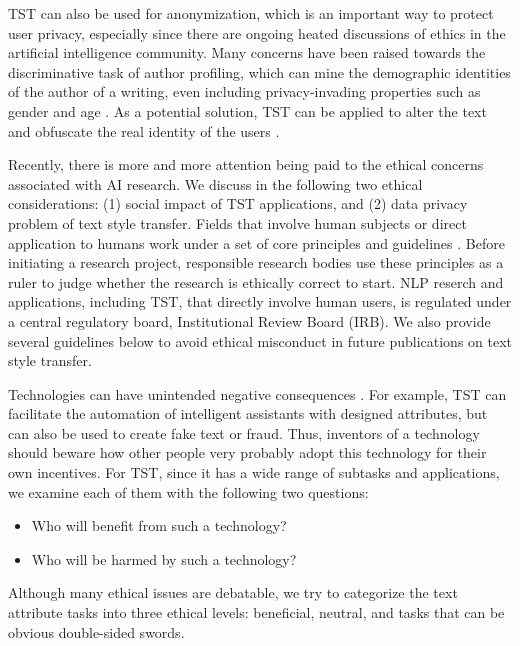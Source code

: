 TST can also be used for anonymization, which is an important way to protect user privacy, especially since there are ongoing heated discussions of ethics in the artificial intelligence community. Many concerns have been raised towards the discriminative task of author profiling, which can mine the demographic identities of the author of a writing, even including privacy-invading properties such as gender and age . As a potential solution, TST can be applied to alter the text and obfuscate the real identity of the users .

\label{sec:ethics}
Recently, there is more and more attention being paid to the ethical concerns associated with AI research. We discuss in the following two ethical considerations: (1) social impact of TST applications, and (2) data privacy problem of text style transfer.
Fields that involve human subjects or direct application to humans work under a set of core principles and guidelines . Before initiating a research project, responsible research bodies use these principles as a ruler to judge whether the research is ethically correct to start. NLP reserch and applications, including TST, that directly involve human users, is regulated under a central regulatory board, Institutional Review Board (IRB). We also provide several guidelines below to avoid ethical misconduct in future publications on text style transfer.

Technologies can have unintended negative consequences . For example, TST can facilitate the automation of intelligent assistants with designed attributes, but can also be used to create fake text or fraud.
Thus, inventors of a technology should beware how other people very probably adopt this technology for their own incentives. 
For TST, since it has a wide range of subtasks and applications, we examine each of them with the following two questions:
\begin{itemize}
    \item Who will benefit from such a technology?
    \item Who will be harmed by such a technology?
\end{itemize}
Although many ethical issues are debatable, we try to categorize the text attribute tasks into three ethical levels: beneficial, neutral, and tasks that can be obvious double-sided swords.

